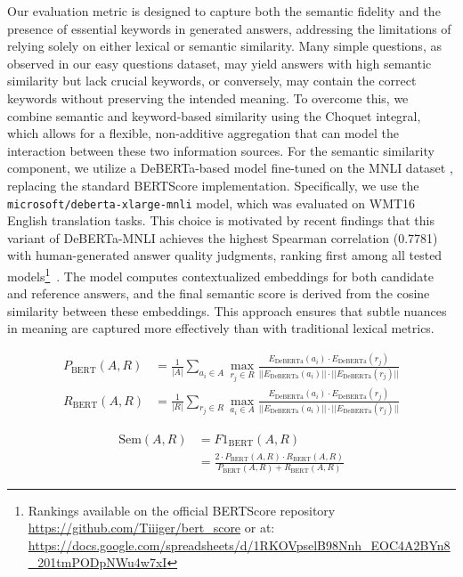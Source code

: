 \documentclass[sigconf]{acmart}
\begin{document}
Our evaluation metric is designed to capture both the semantic fidelity and the presence of essential keywords in generated answers, addressing the limitations of relying solely on either lexical or semantic similarity. Many simple questions, as observed in our easy questions dataset, may yield answers with high semantic similarity but lack crucial keywords, or conversely, may contain the correct keywords without preserving the intended meaning. To overcome this, we combine semantic and keyword-based similarity using the Choquet integral, which allows for a flexible, non-additive aggregation that can model the interaction between these two information sources.
For the semantic similarity component, we utilize a DeBERTa-based model \cite{deberta} fine-tuned on the MNLI dataset \cite{naacl_2018}, replacing the standard BERTScore implementation. Specifically, we use the \texttt{microsoft/deberta-xlarge-mnli} model, which was evaluated on WMT16 \cite{wmt_2016} English translation tasks. This choice is motivated by recent findings that this variant of DeBERTa-MNLI achieves the highest Spearman correlation (0.7781) with human-generated answer quality judgments, ranking first among all tested models\footnote{Rankings available on the official BERTScore repository \url{https://github.com/Tiiiger/bert_score} or at: \url{https://docs.google.com/spreadsheets/d/1RKOVpselB98Nnh_EOC4A2BYn8_201tmPODpNWu4w7xI}}~\cite{emnlp_2015}. The model computes contextualized embeddings for both candidate and reference answers, and the final semantic score is derived from the cosine similarity between these embeddings. This approach ensures that subtle nuances in meaning are captured more effectively than with traditional lexical metrics.

\begin{align}
P_{\text{BERT}}(A, R) &= \frac{1}{|A|} \sum_{a_i \in A} \max_{r_j \in R} \frac{E_{\text{DeBERTa}}(a_i) \cdot E_{\text{DeBERTa}}(r_j)}{||E_{\text{DeBERTa}}(a_i)|| \cdot ||E_{\text{DeBERTa}}(r_j)||} \\
R_{\text{BERT}}(A, R) &= \frac{1}{|R|} \sum_{r_j \in R} \max_{a_i \in A} \frac{E_{\text{DeBERTa}}(a_i) \cdot E_{\text{DeBERTa}}(r_j)}{||E_{\text{DeBERTa}}(a_i)|| \cdot ||E_{\text{DeBERTa}}(r_j)||}
\end{align}

\begin{equation}
    \begin{split}
    \text{Sem}(A, R) &= F1_{\text{BERT}}(A, R) \\
    &= \frac{2 \cdot P_{\text{BERT}}(A, R) \cdot R_{\text{BERT}}(A, R)}{P_{\text{BERT}}(A, R) + R_{\text{BERT}}(A, R)}
    \end{split}
\end{equation}
\end{document}
